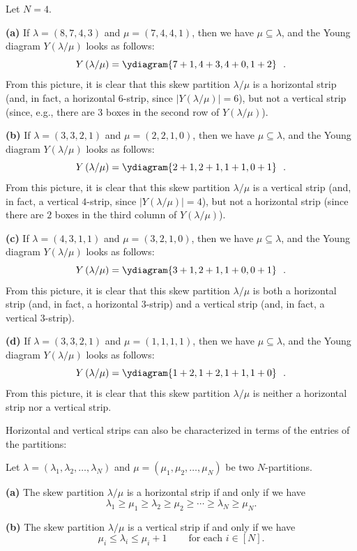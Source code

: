 \begin{example}
Let $N=4$. \medskip

\textbf{(a)} If $\lambda=\left(  8,7,4,3\right)  $ and $\mu=\left(
7,4,4,1\right)  $, then we have $\mu\subseteq\lambda$, and the Young diagram
$Y\left(  \lambda/\mu\right)  $ looks as follows:%
\[
Y\left(  \lambda/\mu\right)  =\ydiagram{7+1,4+3,4+0,1+2}\ \ .
\]
From this picture, it is clear that this skew partition $\lambda/\mu$ is a
horizontal strip (and, in fact, a horizontal $6$-strip, since $\left\vert
Y\left(  \lambda/\mu\right)  \right\vert =6$), but not a vertical strip
(since, e.g., there are $3$ boxes in the second row of $Y\left(  \lambda
/\mu\right)  $). \medskip

\textbf{(b)} If $\lambda=\left(  3,3,2,1\right)  $ and $\mu=\left(
2,2,1,0\right)  $, then we have $\mu\subseteq\lambda$, and the Young diagram
$Y\left(  \lambda/\mu\right)  $ looks as follows:%
\[
Y\left(  \lambda/\mu\right)  =\ydiagram{2+1,2+1,1+1,0+1}\ \ .
\]
From this picture, it is clear that this skew partition $\lambda/\mu$ is a
vertical strip (and, in fact, a vertical $4$-strip, since $\left\vert Y\left(
\lambda/\mu\right)  \right\vert =4$), but not a horizontal strip (since there
are $2$ boxes in the third column of $Y\left(  \lambda/\mu\right)  $).
\medskip

\textbf{(c)} If $\lambda=\left(  4,3,1,1\right)  $ and $\mu=\left(
3,2,1,0\right)  $, then we have $\mu\subseteq\lambda$, and the Young diagram
$Y\left(  \lambda/\mu\right)  $ looks as follows:%
\[
Y\left(  \lambda/\mu\right)  =\ydiagram{3+1,2+1,1+0,0+1}\ \ .
\]
From this picture, it is clear that this skew partition $\lambda/\mu$ is both
a horizontal strip (and, in fact, a horizontal $3$-strip) and a vertical strip
(and, in fact, a vertical $3$-strip). \medskip

\textbf{(d)} If $\lambda=\left(  3,3,2,1\right)  $ and $\mu=\left(
1,1,1,1\right)  $, then we have $\mu\subseteq\lambda$, and the Young diagram
$Y\left(  \lambda/\mu\right)  $ looks as follows:%
\[
Y\left(  \lambda/\mu\right)  =\ydiagram{1+2,1+2,1+1,1+0}\ \ .
\]
From this picture, it is clear that this skew partition $\lambda/\mu$ is
neither a horizontal strip nor a vertical strip.
\end{example}

Horizontal and vertical strips can also be characterized in terms of the
entries of the partitions:

\begin{proposition}
\label{prop.sf.strips.entries}Let $\lambda=\left(  \lambda_{1},\lambda
_{2},\ldots,\lambda_{N}\right)  $ and $\mu=\left(  \mu_{1},\mu_{2},\ldots
,\mu_{N}\right)  $ be two $N$-partitions. \medskip

\textbf{(a)} The skew partition $\lambda/\mu$ is a horizontal strip if and
only if we have%
\[
\lambda_{1}\geq\mu_{1}\geq\lambda_{2}\geq\mu_{2}\geq\cdots\geq\lambda_{N}%
\geq\mu_{N}.
\]


\textbf{(b)} The skew partition $\lambda/\mu$ is a vertical strip if and only
if we have%
\[
\mu_{i}\leq\lambda_{i}\leq\mu_{i}+1\ \ \ \ \ \ \ \ \ \ \text{for each }%
i\in\left[  N\right]  .
\]

\end{proposition}

